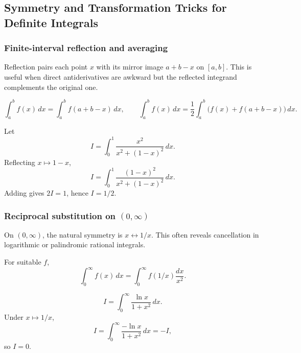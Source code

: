 \newpage
\subsection{Symmetry and Transformation Tricks for Definite Integrals}

\subsubsection{Finite-interval reflection and averaging}
\begin{extension}
Reflection pairs each point \(x\) with its mirror image \(a+b-x\) on \([a,b]\).
This is useful when direct antiderivatives are awkward but the reflected
integrand complements the original one.
\end{extension}

\begin{keyformula}[title={Reflection and Averaging}]
\[
\int_a^b f(x)\,dx=\int_a^b f(a+b-x)\,dx,
\qquad
\int_a^b f(x)\,dx=\frac12\int_a^b\bigl(f(x)+f(a+b-x)\bigr)\,dx.
\]
\end{keyformula}

\begin{examplebox}[title={Complementary Integrand}]
Let
\[
I=\int_0^1\frac{x^2}{x^2+(1-x)^2}\,dx.
\]
Reflecting \(x\mapsto1-x\),
\[
I=\int_0^1\frac{(1-x)^2}{x^2+(1-x)^2}\,dx.
\]
Adding gives \(2I=1\), hence \(I=1/2\).
\end{examplebox}

\newpage
\subsubsection{Reciprocal substitution on \((0,\infty)\)}
\begin{extension}
On \((0,\infty)\), the natural symmetry is \(x\leftrightarrow1/x\).  This often
reveals cancellation in logarithmic or palindromic rational integrals.
\end{extension}

\begin{keyformula}[title={Reciprocal Substitution}]
For suitable \(f\),
\[
\int_0^\infty f(x)\,dx
=\int_0^\infty f(1/x)\frac{dx}{x^2}.
\]
\end{keyformula}

\begin{examplebox}[title={Odd Logarithm Under Inversion}]
\[
I=\int_0^\infty\frac{\ln x}{1+x^2}\,dx.
\]
Under \(x\mapsto1/x\),
\[
I=\int_0^\infty\frac{-\ln x}{1+x^2}\,dx=-I,
\]
so \(I=0\).
\end{examplebox}

